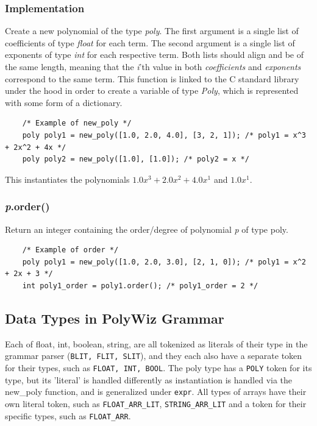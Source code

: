\documentclass{article}
\begin{document}
\subsubsection{Implementation}
Create a new polynomial of the type \textit{poly}. The first argument is a single list of coefficients of type \textit{float} for each term. The second argument is a single list of exponents of type \textit{int} for each respective term. Both lists should align and be of the same length, meaning that the \textit{i}'th value in both \textit{coefficients} and \textit{exponents} correspond to the same term. This function is linked to the C standard library under the hood in order to create a variable of type \textit{Poly}, which is represented with some form of a dictionary.
    \begin{lstlisting}
    /* Example of new_poly */
    poly poly1 = new_poly([1.0, 2.0, 4.0], [3, 2, 1]); /* poly1 = x^3 + 2x^2 + 4x */
    poly poly2 = new_poly([1.0], [1.0]); /* poly2 = x */
    \end{lstlisting}
This instantiates the polynomials $1.0x^{3} + 2.0x^{2} + 4.0x^{1}$ and $1.0x^{1}$. \\
\subsubsection{\textit{p}.order()}
Return an integer containing the order/degree of polynomial \textit{p} of type poly.
    \begin{lstlisting}
    /* Example of order */
    poly poly1 = new_poly([1.0, 2.0, 3.0], [2, 1, 0]); /* poly1 = x^2 + 2x + 3 */
    int poly1_order = poly1.order(); /* poly1_order = 2 */
    \end{lstlisting}

\subsection{Data Types in PolyWiz Grammar}

Each of float, int, boolean, string, are all tokenized as literals of their type in the grammar parser (\lstinline{BLIT, FLIT, SLIT}), and they each also have a separate token for their types, such as \lstinline{FLOAT, INT, BOOL}. The poly type has a \lstinline{POLY} token for its type, but its 'literal' is handled differently as instantiation is handled via the new\_poly function, and is generalized under \lstinline{expr}. All types of arrays have their own literal token, such as \lstinline{FLOAT_ARR_LIT}, \lstinline{STRING_ARR_LIT} and a token for their specific types, such as \lstinline{FLOAT_ARR}.
\end{document}
